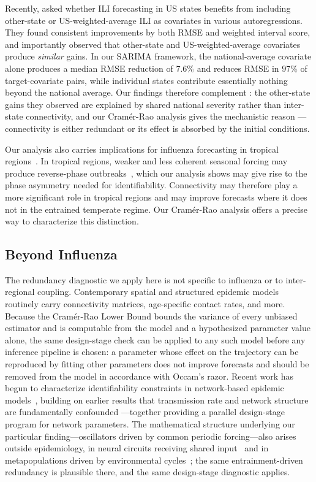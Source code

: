 \documentclass[9pt,twocolumn,twoside]{pnas-new}
\begin{document}
Recently, \citep{thivierge2025} asked whether ILI forecasting in US
states benefits from including other-state or US-weighted-average ILI
as covariates in various autoregressions. They found consistent
improvements by both RMSE and weighted interval score, and importantly
observed that other-state and US-weighted-average covariates produce
\emph{similar} gains. In our SARIMA framework, the national-average
covariate alone produces a median RMSE reduction of $7.6\%$ and
reduces RMSE in $97\%$ of target-covariate pairs, while individual
states contribute essentially nothing beyond the national average. Our
findings therefore complement \citep{thivierge2025}: the other-state
gains they observed are explained by shared national severity rather
than inter-state connectivity, and our Cram\'er-Rao analysis gives
the mechanistic reason --- connectivity is either redundant or its
effect is absorbed by the initial conditions.

Our analysis also carries implications for influenza forecasting in
tropical regions~\citep{tsang2024}. In tropical regions, weaker and
less coherent seasonal forcing may produce reverse-phase
outbreaks~\citep{tamerius2013}, which our analysis shows may give rise
to the phase asymmetry needed for identifiability. Connectivity may
therefore play a more significant role in tropical regions and may
improve forecasts where it does not in the entrained temperate
regime. Our Cram\'er-Rao analysis offers a precise way to characterize
this distinction.

\subsection*{Beyond Influenza}
The redundancy diagnostic we apply here is not specific to influenza
or to inter-regional coupling. Contemporary spatial and structured
epidemic models routinely carry connectivity matrices, age-specific
contact rates, and more. Because the Cram\'er-Rao Lower Bound bounds
the variance of every unbiased estimator and is computable from the
model and a hypothesized parameter value alone, the same design-stage
check can be applied to any such model before any inference pipeline
is chosen: a parameter whose effect on the trajectory can be
reproduced by fitting other parameters does not improve forecasts and
should be removed from the model in accordance with Occam's razor.
Recent work has begun to characterize identifiability constraints in
network-based epidemic models~\citep{kiss2023parameter, dilauro2020,
  kiss2024towards}, building on earlier results that transmission rate
and network structure are fundamentally confounded
\citep{welch2011}---together providing a parallel design-stage program
for network parameters. The mathematical structure underlying our
particular finding---oscillators driven by common periodic
forcing---also arises outside epidemiology, in neural circuits
receiving shared input~\citep{reid2019, pikovsky2001} and in
metapopulations driven by environmental cycles~\citep{bjornstad1999};
the same entrainment-driven redundancy is plausible there, and the
same design-stage diagnostic applies.
\end{document}
